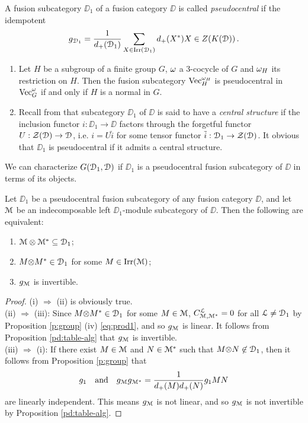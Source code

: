 \documentclass{amsart}
\begin{document}
\begin{defn}\label{d:pseudocentral}
A fusion subcategory $\DD_1$ of a fusion category $\DD$ is called \emph{pseudocentral} if the idempotent 
$$
g_{{\EuScript{D}}_1} = \frac{1}{d_+({\EuScript{D}}_1)} \sum_{X \in \operatorname{Irr}({\EuScript{D}}_1)} d_+(X^*) X \in Z({K({\EuScript{D}})})\,.
$$
\end{defn}
\begin{rmk} \begin{enumerate}
\item  Let $H$ be a subgroup of a finite group $G$, $\omega$ a 3-cocycle of $G$ and $\omega_H$ its restriction on $H$. 
Then the fusion subcategory ${\operatorname{Vec}}_H^{\omega_H}$ is pseudocentral in ${\operatorname{Vec}}_G^{\omega}$ if and only if $H$ is a normal in $G$. 
\item Recall from \cite[Def. 2.4]{DMNO} that subcategory $\DD_1$ of $\DD$ is said to have a \emph{central structure} if the  inclusion functor $i : \DD_1 \to \DD$  factors through the forgetful functor $U:\mathcal{Z}({\EuScript{D}}) \to {\EuScript{D}}$, i.e. $i = U \tilde i$ for some tensor functor $\tilde i: {\EuScript{D}}_1 \to \mathcal{Z}({\EuScript{D}})$. It obvious that $\DD_1$ is pseudocentral if it admits a central structure. \qedhere
\end{enumerate}
\end{rmk}
We can characterize ${G({\EuScript{D}}_1, {\EuScript{D}})}$ if $\DD_1$ is a pseudocentral fusion subcategory of $\DD$ in terms of its objects.
\begin{thm}  \label{p:invertible}
Let $\DD_1$ be a pseudocentral fusion subcategory of any fusion category $\DD$, and let ${\EuScript{M}}$ be an indecomposable left $\DD_1$-module subcategory of $\DD$. Then the following are equivalent:
\begin{enumerate}
    \item ${\EuScript{M}}\otimes {\EuScript{M}}^* \subseteq {\EuScript{D}}_1$;
    \item $M {\otimes} M^* \in {\EuScript{D}}_1$ for some $M \in \operatorname{Irr}({\EuScript{M}})$;
    \item $g_{{\EuScript{M}}}$ is invertible.
\end{enumerate}
\end{thm}
\begin{proof} (i) $\Rightarrow$ (ii) is obviously true.\\
(ii) $\Rightarrow$ (iii): Since  $M{\otimes} M^* \in {\EuScript{D}}_1$ for some $M \in {\EuScript{M}}$, $C^{\EuScript{L}}_{{\EuScript{M}},{\EuScript{M}}^*}=0$ for all ${\EuScript{L}} \ne {\EuScript{D}}_1$ by Proposition \ref{p:group} (iv) \eqref{eq:prod1}, and so ${g_{\EuScript{M}}}$ is linear. It follows from Proposition \ref{pd:table-alg} that  ${g_{\EuScript{M}}}$ is invertible.\\
(iii) $\Rightarrow$ (i):  If there exist $M \in {\EuScript{M}}$ and $N \in {\EuScript{M}}^*$ such that $M {\otimes} N \not\in {\EuScript{D}}_1$, then it follows from Proposition \ref{p:group} that
$$
g_1   \quad\text{and}\quad {g_{\EuScript{M}}} {g_{{\EuScript{M}}^*}}=\frac{1}{d_+(M)d_+(N)} g_1 MN
$$ 
are linearly independent. This means ${g_{\EuScript{M}}}$ is not linear, and so ${g_{\EuScript{M}}}$ is not invertible by Proposition \ref{pd:table-alg}.   
\end{proof}
\end{document}
